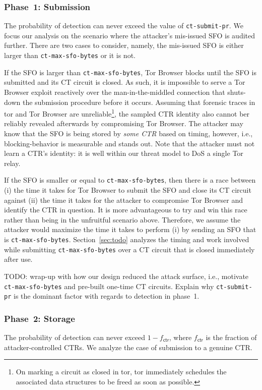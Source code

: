 \subsubsection{Phase~1: Submission} \label{sec:analysis:pr:phase1}
The probability of detection can never exceed the value of
\texttt{ct-submit-pr}.  We focus our analysis on the scenario where the
attacker's mis-issued SFO is audited further.  There are two cases to consider,
namely, the mis-issued SFO is either larger than \texttt{ct-max-sfo-bytes} or it
is not.

If the SFO is larger than \texttt{ct-max-sfo-bytes}, Tor Browser blocks until
the SFO is submitted and its CT circuit is closed.  As such, it is impossible to
serve a Tor Browser exploit reactively over the man-in-the-middled connection
that shuts-down the submission procedure before it occurs.  Assuming that
forensic traces in tor and Tor Browser are unreliable\footnote{On marking a
circuit as closed in tor, tor immediately schedules the associated data
structures to be freed as soon as possible.}, the sampled CTR identity also
cannot ber reliably revealed afterwards by compromising Tor Browser.  The
attacker may know that the SFO is being stored by \emph{some CTR} based on
timing, however, i.e., blocking-behavior is measurable and stands out. Note that
the attacker must not learn a CTR's identity: it is well within our threat model
to DoS a single Tor relay.

If the SFO is smaller or equal to \texttt{ct-max-sfo-bytes}, then there is a
race between (i) the time it takes for Tor Browser to submit the SFO and close
its CT circuit against (ii) the time it takes for the attacker to compromise Tor
Browser and identify the CTR in question.  It is more advantageous to try and
win this race rather than being in the unfruitful scenario above.  Therefore, we
assume the attacker would maximize the time it takes to perform (i) by sending
an SFO that is \texttt{ct-max-sfo-bytes}.  Section~\ref{sec:todo} analyzes the
timing and work involved while submitting \texttt{ct-max-sfo-bytes} over a CT
circuit that is closed immediately after use.

TODO: wrap-up with how our design reduced the attack surface, i.e., motivate
\texttt{ct-max-sfo-bytes} and pre-built one-time CT circuits.  Explain
why \texttt{ct-submit-pr} is the dominant factor with regards to detection in
phase~1.

\subsubsection{Phase~2: Storage} \label{sec:analysis:pr:phase2}
The probability of detection can never exceed $1-f_{\mathsf{ctr}}$, where
$f_{\mathsf{ctr}}$ is the fraction of attacker-controlled CTRs.  We analyze
the case of submission to a genuine CTR.

